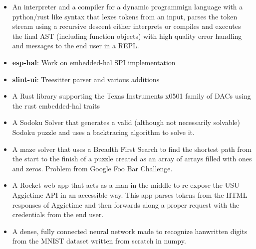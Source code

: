 \begin{itemize}
    \item An interpreter and a compiler for a dynamic programmign language with a python/rust like
        syntax that lexes tokens from an input, parses the token stream using a recursive descent
		either interprets or compiles and executes the final AST (including
        function objects) with high quality error handling and messages to the end user in a REPL.
\end{itemize}
\smallskip
\smallskip
{}
\begin{itemize}
    \item \textbf{esp-hal}: Work on embedded-hal SPI implementation
    \item \textbf{slint-ui}: Treesitter parser and various additions
\end{itemize}
\smallskip
\smallskip
{}
\begin{itemize}
    \item A Rust library supporting the Texas Instruments x0501 family of DACs using the
        rust embedded-hal traits
\end{itemize}
\smallskip
\smallskip
{}
\begin{itemize}
	\item A Sodoku Solver that generates a valid (although not
		necessarily solvable) Sodoku puzzle and uses a backtracing algorithm to
		solve it. 
\end{itemize}
\smallskip
{}
\begin{itemize}
    \item A maze solver that uses a Breadth First Search to find the shortest
        path from the start to the finish of a puzzle created as an array of
        arrays filled with ones and zeros. Problem from Google Foo Bar
        Challenge.
\end{itemize}
\smallskip
{}
\begin{itemize}
	\item A Rocket web app that acts as a man in the middle to
		re-expose the USU Aggietime API in an accessible way. This app parses
		tokens from the HTML responses of Aggietime and then forwards along a
		proper request with the credentials from the end user.
\end{itemize}
\smallskip
{}
\begin{itemize}
	\item A dense, fully connected neural network made to recognize hanwritten
		digits from the MNIST dataset written from scratch in numpy.
\end{itemize}
